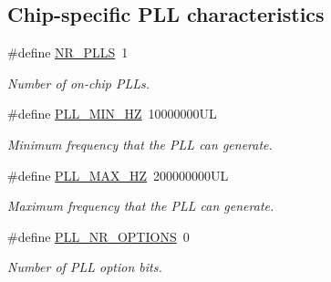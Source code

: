 \subsection*{Chip-\/specific P\-L\-L characteristics}
\begin{DoxyCompactItemize}
\item 
\hypertarget{group__pll__group_ga23ebd75638f609ce613b82e773ea48a5}{\#define \hyperlink{group__pll__group_ga23ebd75638f609ce613b82e773ea48a5}{N\-R\-\_\-\-P\-L\-L\-S}~1}\label{group__pll__group_ga23ebd75638f609ce613b82e773ea48a5}

\begin{DoxyCompactList}\small\item\em Number of on-\/chip P\-L\-Ls. \end{DoxyCompactList}\item 
\hypertarget{group__pll__group_ga58acd4425beaa32dad5ccffa073cb0a5}{\#define \hyperlink{group__pll__group_ga58acd4425beaa32dad5ccffa073cb0a5}{P\-L\-L\-\_\-\-M\-I\-N\-\_\-\-H\-Z}~10000000\-U\-L}\label{group__pll__group_ga58acd4425beaa32dad5ccffa073cb0a5}

\begin{DoxyCompactList}\small\item\em Minimum frequency that the P\-L\-L can generate. \end{DoxyCompactList}\item 
\hypertarget{group__pll__group_gaeced77fb7ec635ab33085a71a0c15227}{\#define \hyperlink{group__pll__group_gaeced77fb7ec635ab33085a71a0c15227}{P\-L\-L\-\_\-\-M\-A\-X\-\_\-\-H\-Z}~200000000\-U\-L}\label{group__pll__group_gaeced77fb7ec635ab33085a71a0c15227}

\begin{DoxyCompactList}\small\item\em Maximum frequency that the P\-L\-L can generate. \end{DoxyCompactList}\item 
\hypertarget{group__pll__group_gae74457d5b4073fdb82cb6b9f3d8b76e2}{\#define \hyperlink{group__pll__group_gae74457d5b4073fdb82cb6b9f3d8b76e2}{P\-L\-L\-\_\-\-N\-R\-\_\-\-O\-P\-T\-I\-O\-N\-S}~0}\label{group__pll__group_gae74457d5b4073fdb82cb6b9f3d8b76e2}

\begin{DoxyCompactList}\small\item\em Number of P\-L\-L option bits. \end{DoxyCompactList}\end{DoxyCompactItemize}
